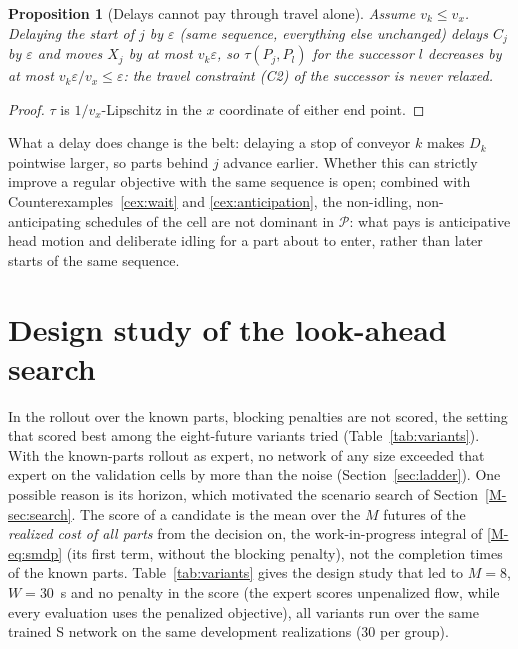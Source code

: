 \documentclass[11pt,a4paper]{article}
\theoremstyle{plain}
\newtheorem{proposition}{Proposition}
\theoremstyle{definition}
\theoremstyle{remark}
\newcommand{\Pb}{\mathcal{P}}
\begin{document}
\begin{proposition}[Delays cannot pay through travel alone]\label{prop:delay}
Assume $v_k\le v_x$. Delaying the start of $j$ by $\varepsilon$ (same sequence, everything
else unchanged) delays $C_j$ by $\varepsilon$ and moves $X_j$ by at most $v_k\varepsilon$,
so $\tau(P_j,P_l)$ for the successor $l$ decreases by at most $v_k\varepsilon/v_x\le\varepsilon$:
the travel constraint (C2) of the successor is never relaxed.
\end{proposition}
\begin{proof}
$\tau$ is $1/v_x$-Lipschitz in the $x$ coordinate of either end point.
\end{proof}
What a delay does change is the belt: delaying a stop of conveyor $k$ makes $D_k$
pointwise larger, so parts behind $j$ advance earlier. Whether this can strictly improve a
regular objective with the same sequence is open; combined with
Counterexamples~\ref{cex:wait} and \ref{cex:anticipation}, the non-idling,
non-anticipating schedules of the cell are not dominant in $\Pb$: what pays is
anticipative head motion and deliberate idling for a part about to enter, rather than
later starts of the same sequence.

\section{Design study of the look-ahead search}\label{sec:searchdesign}
In the rollout over the known parts, blocking penalties are not scored, the setting that
scored best among the eight-future variants tried (Table~\ref{tab:variants}). With the
known-parts rollout as expert, no network of any size exceeded that expert on the
validation cells by more than the noise (Section~\ref{sec:ladder}). One possible reason is
its horizon, which motivated the scenario search of Section~\ref{M-sec:search}. The
score of a candidate is the mean over the $M$ futures of the \emph{realized cost of all
parts} from the decision on, the work-in-progress integral of \eqref{M-eq:smdp} (its first
term, without the blocking penalty), not the completion times of the known parts. Table~\ref{tab:variants} gives the design study that
led to $M=8$, $W=30$~s and no penalty in the score (the expert scores unpenalized flow,
while every evaluation uses the penalized objective), all variants run over the same trained
S network on the same development realizations (30 per group).
\end{document}
